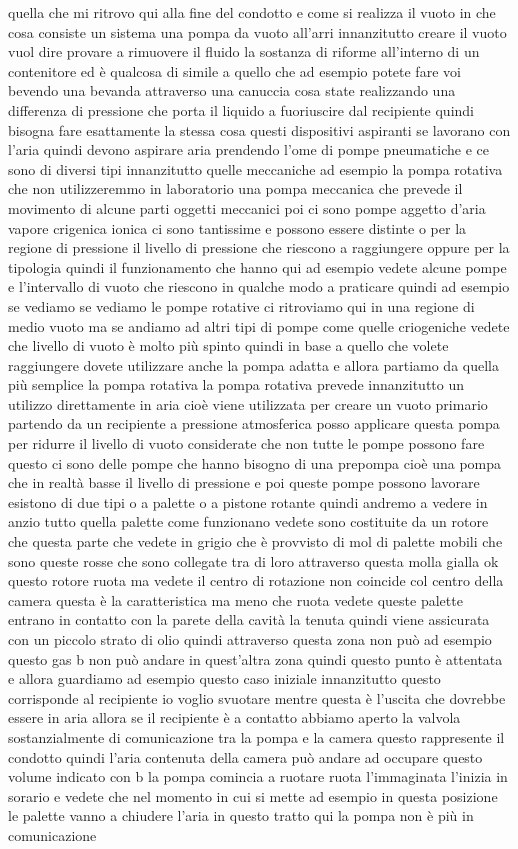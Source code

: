 quella che mi ritrovo qui alla fine del condotto e come si realizza il vuoto in che cosa consiste un sistema una pompa da vuoto all'arri innanzitutto creare il vuoto vuol dire provare a rimuovere il fluido la sostanza di riforme all'interno di un contenitore ed è qualcosa di simile a quello che ad esempio potete fare voi bevendo una bevanda attraverso una canuccia cosa state realizzando una differenza di pressione che porta il liquido a fuoriuscire dal recipiente quindi bisogna fare esattamente la stessa cosa questi dispositivi aspiranti se lavorano con l'aria quindi devono aspirare aria prendendo l'ome di pompe pneumatiche e ce sono di diversi tipi innanzitutto quelle meccaniche ad esempio la pompa rotativa che non utilizzeremmo in laboratorio una pompa meccanica che prevede il movimento di alcune parti oggetti meccanici poi ci sono pompe aggetto d'aria vapore crigenica ionica ci sono tantissime e possono essere distinte o per la regione di pressione il livello di pressione che riescono a raggiungere oppure per la tipologia quindi il funzionamento che hanno qui ad esempio vedete alcune pompe e l'intervallo di vuoto che riescono in qualche modo a praticare quindi ad esempio se vediamo se vediamo le pompe rotative ci ritroviamo qui in una regione di medio vuoto ma se andiamo ad altri tipi di pompe come quelle criogeniche vedete che livello di vuoto è molto più spinto quindi in base a quello che volete raggiungere dovete utilizzare anche la pompa adatta e allora partiamo da quella più semplice la pompa rotativa la pompa rotativa prevede innanzitutto un utilizzo direttamente in aria cioè viene utilizzata per creare un vuoto primario partendo da un recipiente a pressione atmosferica posso applicare questa pompa per ridurre il livello di vuoto considerate che non tutte le pompe possono fare questo ci sono delle pompe che hanno bisogno di una prepompa cioè una pompa che in realtà basse il livello di pressione e poi queste pompe possono lavorare esistono di due tipi o a palette o a pistone rotante quindi andremo a vedere in anzio tutto quella palette come funzionano vedete sono costituite da un rotore che questa parte che vedete in grigio che è provvisto di mol di palette mobili che sono queste rosse che sono collegate tra di loro attraverso questa molla gialla ok questo rotore ruota ma vedete il centro di rotazione non coincide col centro della camera questa è la caratteristica ma meno che ruota vedete queste palette entrano in contatto con la parete della cavità la tenuta quindi viene assicurata con un piccolo strato di olio quindi attraverso questa zona non può ad esempio questo gas b non può andare in quest'altra zona quindi questo punto è attentata e allora guardiamo ad esempio questo caso iniziale innanzitutto questo corrisponde al recipiente io voglio svuotare mentre questa è l'uscita che dovrebbe essere in aria allora se il recipiente è a contatto abbiamo aperto la valvola sostanzialmente di comunicazione tra la pompa e la camera questo rappresente il condotto quindi l'aria contenuta della camera può andare ad occupare questo volume indicato con b la pompa comincia a ruotare ruota l'immaginata l'inizia in sorario e vedete che nel momento in cui si mette ad esempio in questa posizione le palette vanno a chiudere l'aria in questo tratto qui la pompa non è più in comunicazione 